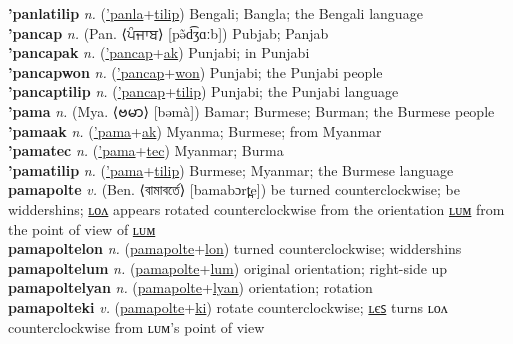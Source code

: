\textbf{'panlatilip} \textit{n.} (\hyperref['panla]{'panla}+\hyperref[tilip]{tilip})
Bengali; Bangla; the Bengali language \label{'panlatilip} \\
\textbf{'pancap} \textit{n.} (Pan. ⟨ਪੰਜਾਬ⟩ [pə̃d͡ʒɑːb])
Pubjab; Panjab \label{'pancap} \\
\textbf{'pancapak} \textit{n.} (\hyperref['pancap]{'pancap}+\hyperref[ak]{ak})
Punjabi; in Punjabi \label{'pancapak} \\
\textbf{'pancapwon} \textit{n.} (\hyperref['pancap]{'pancap}+\hyperref[won]{won})
Punjabi; the Punjabi people \label{'pancapwon} \\
\textbf{'pancaptilip} \textit{n.} (\hyperref['pancap]{'pancap}+\hyperref[tilip]{tilip})
Punjabi; the Punjabi language \label{'pancaptilip} \\
\textbf{'pama} \textit{n.} (Mya. ⟨ဗမာ⟩ [bəmà])
Bamar; Burmese; Burman; the Burmese people \label{'pama} \\
\textbf{'pamaak} \textit{n.} (\hyperref['pama]{'pama}+\hyperref[ak]{ak})
Myanma; Burmese; from Myanmar \label{'pamaak} \\
\textbf{'pamatec} \textit{n.} (\hyperref['pama]{'pama}+\hyperref[tec]{tec})
Myanmar; Burma \label{'pamatec} \\
\textbf{'pamatilip} \textit{n.} (\hyperref['pama]{'pama}+\hyperref[tilip]{tilip})
Burmese; Myanmar; the Burmese language \label{'pamatilip} \\
\textbf{pamapolte} \textit{v.} (Ben. ⟨বামাবর্তে⟩ [bamabɔrt̪e])
be turned counterclockwise; be widdershins; \hyperref[pamapoltelon]{ʟᴏᴧ} appears rotated counterclockwise from the orientation \hyperref[pamapoltelum]{ʟᴜᴍ} from the point of view of \hyperref[pamapoltelum]{ʟᴜᴍ} \label{pamapolte} \\
\textbf{pamapoltelon} \textit{n.} (\hyperref[pamapolte]{pamapolte}+\hyperref[lon]{lon})
turned counterclockwise; widdershins \label{pamapoltelon} \\
\textbf{pamapoltelum} \textit{n.} (\hyperref[pamapolte]{pamapolte}+\hyperref[lum]{lum})
original orientation; right-side up \label{pamapoltelum} \\
\textbf{pamapoltelyan} \textit{n.} (\hyperref[pamapolte]{pamapolte}+\hyperref[lyan]{lyan})
orientation; rotation \label{pamapoltelyan} \\
\textbf{pamapolteki} \textit{v.} (\hyperref[pamapolte]{pamapolte}+\hyperref[ki]{ki})
rotate counterclockwise; \hyperref[pamapoltekiles]{ʟєꜱ} turns ʟᴏᴧ counterclockwise from ʟᴜᴍ's point of view \label{pamapolteki} \\
